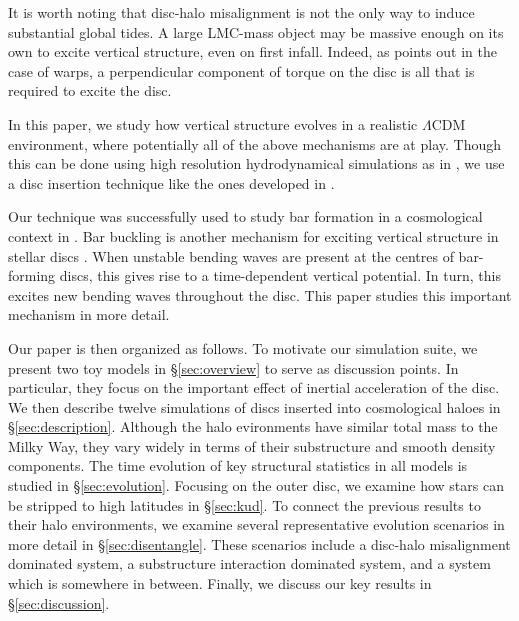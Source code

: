 It is worth noting that disc-halo misalignment is not the only way to induce substantial global tides. A large LMC-mass object may be massive enough on its own to excite vertical structure, even on first infall. Indeed, as \citet{binney_1992} points out in the case of warps, a perpendicular component of torque on the disc is all that is required to excite the disc.





%






In this paper, we study how vertical structure evolves in a realistic $\Lambda$CDM environment, where potentially all of the above mechanisms are at play. Though this can be done using high resolution hydrodynamical simulations as in \citet{gomez_2017}, we use a disc insertion technique like the ones developed in \citet{berentzen_2006, debuhr_2012, ys_2015, bauer2018a, hu_2018}.

Our technique was successfully used to study bar formation in a cosmological context in \citet{bauer2018b}. Bar buckling is another mechanism for exciting vertical structure in stellar discs \citep{bar_buckling_echo}. When unstable bending waves are present at the centres of bar-forming discs, this gives rise to a time-dependent vertical potential. In turn, this excites new bending waves throughout the disc. This paper studies this important mechanism in more detail.



Our paper is then organized as follows. To motivate our simulation suite, we present two toy models in \S\ref{sec:overview} to serve as discussion points. In particular, they focus on the important effect of inertial acceleration of the disc. We then describe twelve simulations of discs inserted into cosmological haloes in \S \ref{sec:description}. Although the halo evironments have similar total mass to the Milky Way, they vary widely in terms of their substructure and smooth density components. The time evolution of key structural statistics in all models is studied in \S \ref{sec:evolution}. Focusing on the outer disc, we examine how stars can be stripped to high latitudes in \S \ref{sec:kud}. To connect the previous results to their halo environments, we examine several representative evolution scenarios in more detail in \S\ref{sec:disentangle}. These scenarios include a disc-halo misalignment dominated system, a substructure interaction dominated system, and a system which is somewhere in between. Finally, we discuss our key results in \S\ref{sec:discussion}.


